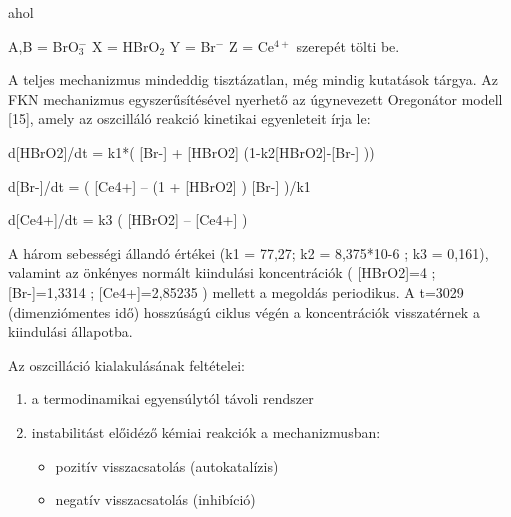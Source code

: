 ahol

A,B = BrO$_3^-$
X = HBrO$_2$
Y = Br$^-$
Z = Ce$^{4+}$ szerepét tölti be.

A teljes mechanizmus mindeddig tisztázatlan, még mindig kutatások tárgya. Az FKN mechanizmus egyszerűsítésével nyerhető az úgynevezett Oregonátor modell [15], amely az oszcilláló reakció kinetikai egyenleteit írja le:

\begin{center}
d[HBrO2]/dt = k1*( [Br-] + [HBrO2] (1-k2[HBrO2]-[Br-] ))

d[Br-]/dt = ( [Ce4+] – (1 + [HBrO2] ) [Br-] )/k1

d[Ce4+]/dt = k3 ( [HBrO2] – [Ce4+] )
\end{center}

A három sebességi állandó értékei (k1 = 77,27;    k2 = 8,375*10-6 ; k3 = 0,161), valamint az önkényes normált kiindulási koncentrációk ( [HBrO2]=4 ; [Br-]=1,3314 ; [Ce4+]=2,85235 ) mellett a megoldás periodikus. A t=3029 (dimenziómentes idő) hosszúságú ciklus végén a koncentrációk visszatérnek a kiindulási állapotba.


%
%
%
%
%

Az oszcilláció kialakulásának feltételei:
\begin{enumerate}
\item a termodinamikai egyensúlytól távoli rendszer
\item instabilitást előidéző kémiai reakciók a mechanizmusban:
 \begin{itemize}
\item pozitív visszacsatolás (autokatalízis)
\item negatív visszacsatolás (inhibíció)
\end{itemize}
\end{enumerate}

